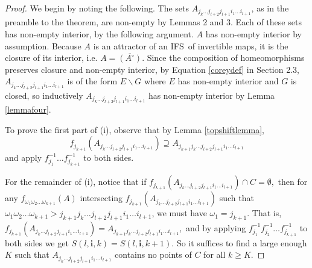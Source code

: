 \documentclass[10pt,a4paper]{amsart}
\begin{document}
\begin{proof}
We begin by noting the following. The sets $A_{j_{k}\dots j_{l+2}j_{l+1}%
i_{1}\dots i_{l+1}}$, as in the preamble to the theorem, are non-empty by
Lemmas 2 and 3. Each of these sets has non-empty interior, by the following
argument. $A$ has non-empty interior by assumption. Because $A$ is an
attractor of an IFS\ of invertible maps, it is the closure of its interior,
i.e. $A=\overline{(A^{\circ})}$. Since the composition of homeomorphisms
preserves closure and non-empty interior, by Equation \ref{coreydef} in
Section 2.3, $A_{j_{k}\dots j_{l+2}j_{l+1}i_{1}\dots i_{l+1}}$ is of the form
$E\backslash G$ where $E$ has non-empty interior and $G$ is closed, so
inductively $A_{j_{k}\dots j_{l+2}j_{l+1}i_{1}\dots i_{l+1}}$ has non-empty
interior by Lemma \ref{lemmafour}.

To prove the first part of (i), observe that by Lemma \ref{topshiftlemma},
\[
f_{j_{k+1}}(A_{j_{k}\dots j_{l+2}j_{l+1}i_{1}\dots i_{l+1}})\supseteq
A_{j_{k+1}j_{k}\dots j_{l+2}j_{l+1}i_{1}\dots i_{l+1}}%
\]
and apply $f_{j_{1}}^{-1}\dots f_{j_{k+1}}^{-1}$ to both sides.

For the remainder of (i), notice that if $f_{j_{k+1}}(A_{j_{k}\dots
j_{l+2}j_{l+1}i_{1}\dots i_{l+1}})\cap C=\emptyset,$ then for any
$f_{\omega_{1}\omega_{2}\dots\omega_{k+1}}(A)$ intersecting $f_{j_{k+1}%
}(A_{j_{k}\dots j_{l+2}j_{l+1}i_{1}\dots i_{l+1}})$ such that $\omega
_{1}\omega_{2}\dots\omega_{k+1}>j_{k+1}j_{k}\dots j_{l+2}j_{l+1}i_{1}\dots
i_{l+1}$, we must have $\omega_{1}=j_{k+1}$. That is, $f_{j_{k+1}}%
(A_{j_{k}\dots j_{l+2}j_{l+1}i_{1}\dots i_{l+1}})=A_{j_{k+1}j_{k}\dots
j_{l+2}j_{l+1}i_{1}\dots i_{l+1}},$ and by applying $f_{j_{1}}^{-1}f_{j_{2}%
}^{-1}\dots f_{j_{k+1}}^{-1}$ to both sides we get $S(l,\mathbf{i,}%
k)=S(l,\mathbf{i,}k+1).$ So it suffices to find a large enough $K$ such that
$A_{j_{k}\dots j_{l+2}j_{l+1}i_{1}\dots i_{l+1}}$ contains no points of $C$
for all $k\geq K$.


\end{proof}
\end{document}
